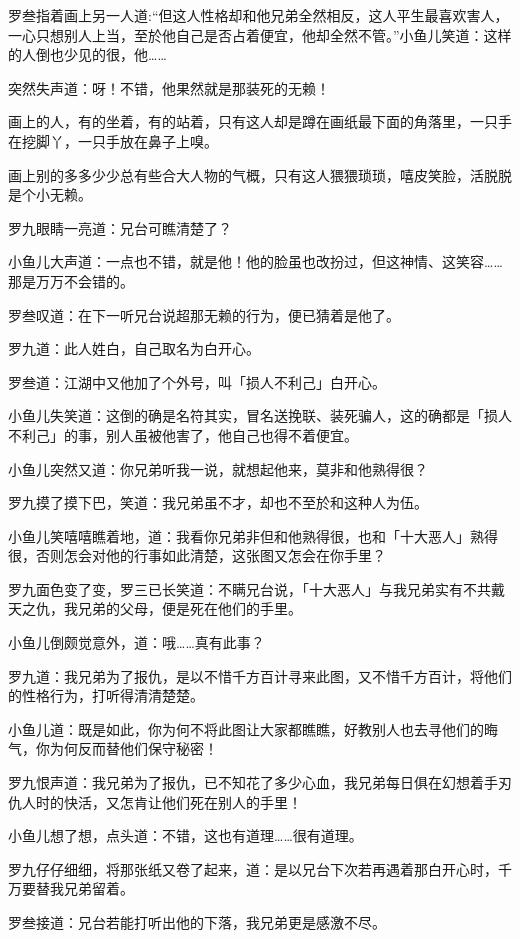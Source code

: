 \documentclass[12pt,oneside]{book}
\begin{document}
罗叁指着画上另一人道:``但这人性格却和他兄弟全然相反，这人平生最喜欢害人，一心只想别人上当，至於他自己是否占着便宜，他却全然不管。''小鱼儿笑道：这样的人倒也少见的很，他\ldots\ldots{}

突然失声道：呀！不错，他果然就是那装死的无赖！

画上的人，有的坐着，有的站着，只有这人却是蹲在画纸最下面的角落里，一只手在挖脚丫，一只手放在鼻子上嗅。

画上别的多多少少总有些合大人物的气概，只有这人猥猥琐琐，嘻皮笑脸，活脱脱是个小无赖。

罗九眼睛一亮道：兄台可瞧清楚了？

小鱼儿大声道：一点也不错，就是他！他的脸虽也改扮过，但这神情、这笑容\ldots\ldots 那是万万不会错的。

罗叁叹道：在下一听兄台说超那无赖的行为，便已猜着是他了。

罗九道：此人姓白，自己取名为白开心。

罗叁道：江湖中又他加了个外号，叫「损人不利己」白开心。

小鱼儿失笑道：这倒的确是名符其实，冒名送挽联、装死骗人，这的确都是「损人不利己」的事，别人虽被他害了，他自己也得不着便宜。

小鱼儿突然又道：你兄弟听我一说，就想起他来，莫非和他熟得很？

罗九摸了摸下巴，笑道：我兄弟虽不才，却也不至於和这种人为伍。

小鱼儿笑嘻嘻瞧着地，道：我看你兄弟非但和他熟得很，也和「十大恶人」熟得很，否则怎会对他的行事如此清楚，这张图又怎会在你手里？

罗九面色变了变，罗三已长笑道：不瞒兄台说，「十大恶人」与我兄弟实有不共戴天之仇，我兄弟的父母，便是死在他们的手里。

小鱼儿倒颇觉意外，道：哦\ldots\ldots 真有此事？

罗九道：我兄弟为了报仇，是以不惜千方百计寻来此图，又不惜千方百计，将他们的性格行为，打听得清清楚楚。

小鱼儿道：既是如此，你为何不将此图让大家都瞧瞧，好教别人也去寻他们的晦气，你为何反而替他们保守秘密！

罗九恨声道：我兄弟为了报仇，已不知花了多少心血，我兄弟每日俱在幻想着手刃仇人时的快活，又怎肯让他们死在别人的手里！

小鱼儿想了想，点头道：不错，这也有道理\ldots\ldots 很有道理。

罗九仔仔细细，将那张纸又卷了起来，道：是以兄台下次若再遇着那白开心时，千万要替我兄弟留着。

罗叁接道：兄台若能打听出他的下落，我兄弟更是感激不尽。
\end{document}
